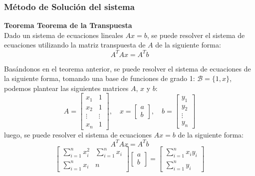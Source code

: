 \documentclass{article}
\newenvironment{theorem}[2][Teorema]
    { \begin{mdframed}[backgroundcolor=green!20] \textbf{#1 #2} \\}
    {  \end{mdframed}}
\begin{document}
\subsubsection{Método de Solución del sistema}
\begin{theorem}{Teorema de la Transpuesta}
    Dado un sistema de ecuaciones lineales $Ax = b$, se puede resolver el sistema de ecuaciones utilizando la matriz transpuesta de $A$ de la siguiente forma:
    \begin{equation}
        A^TAx = A^Tb
    \end{equation}
\end{theorem}
Basándonos en el teorema anterior, se puede resolver el sistema de ecuaciones de la siguiente forma, tomando una base de funciones de grado 1: $\mathcal{B} = \{1, x\}$, podemos plantear las siguientes matrices $A$, $x$ y $b$:
\begin{equation}
    A = \begin{bmatrix}
        x_1 & 1 \\
        x_2 & 1 \\
        \vdots & \vdots \\
        x_n & 1
    \end{bmatrix}, \quad x = \begin{bmatrix}
        a \\
        b
    \end{bmatrix}, \quad b = \begin{bmatrix}
        y_1 \\
        y_2 \\
        \vdots \\
        y_n
    \end{bmatrix}
\end{equation}
luego, se puede resolver el sistema de ecuaciones $Ax = b$ de la siguiente forma:
\begin{equation}
    A^TAx = A^Tb
\end{equation}
\begin{equation}
    \begin{bmatrix}
        \sum_{i=1}^{n} x_i^2 & \sum_{i=1}^{n} x_i \\
        \sum_{i=1}^{n} x_i & n
    \end{bmatrix} \begin{bmatrix}
        a \\
        b
    \end{bmatrix} = \begin{bmatrix}
        \sum_{i=1}^{n} x_iy_i \\
        \sum_{i=1}^{n} y_i
    \end{bmatrix}
\end{equation}
\end{document}
